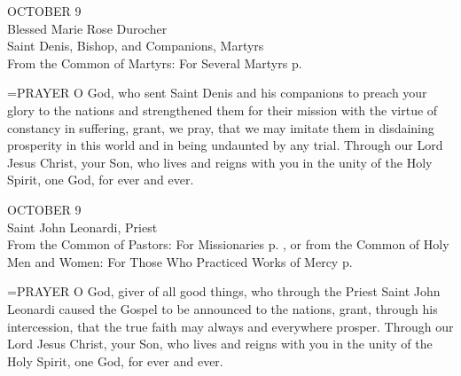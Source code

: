 \begin{center}\normalsize OCTOBER 9\\
\footnotesize Blessed Marie Rose Durocher\\
\footnotesize Saint Denis, Bishop, and Companions, Martyrs\\
\footnotesize From the Common of Martyrs: For Several Martyrs p.\\
\end{center}

\hangindent=\parindent \small{PRAYER 
O God, who sent Saint Denis and his companions
to preach your glory to the nations
and strengthened them for their mission
with the virtue of constancy in suffering,
grant, we pray, that we may imitate them
in disdaining prosperity in this world
and in being undaunted by any trial.
Through our Lord Jesus Christ, your Son,
who lives and reigns with you in the unity of the Holy Spirit,
one God, for ever and ever.\\}
 
\begin{center}\normalsize OCTOBER 9\\
\footnotesize Saint John Leonardi, Priest\\
\footnotesize From the Common of Pastors: For Missionaries p.   , or from the Common of Holy\\
\footnotesize Men and Women: For Those Who Practiced Works of Mercy p.\\
\end{center}

\hangindent=\parindent \small{PRAYER 
O God, giver of all good things,
who through the Priest Saint John Leonardi
caused the Gospel to be announced to the nations,
grant, through his intercession,
that the true faith may always and everywhere prosper.
Through our Lord Jesus Christ, your Son,
who lives and reigns with you in the unity of the Holy Spirit,
one God, for ever and ever.\\}
 
